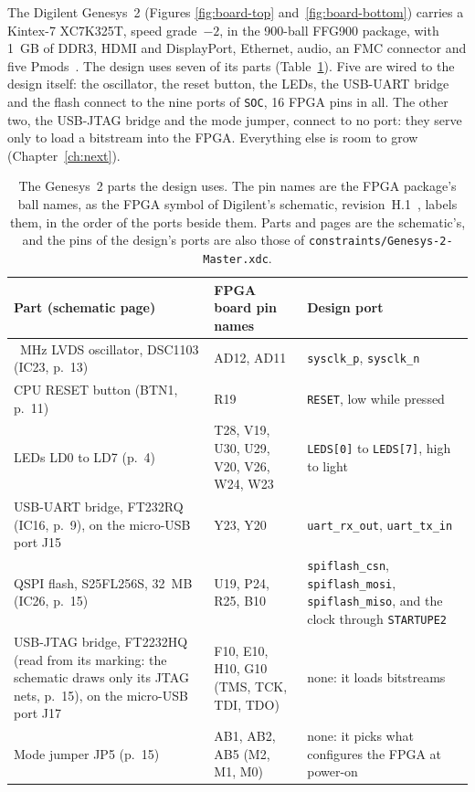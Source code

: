 \documentclass[11pt,a4paper]{report}
\begin{document}
The Digilent Genesys~2 (Figures \ref{fig:board-top} and~\ref{fig:board-bottom}) carries a
Kintex-7 XC7K325T, speed grade~$-2$, in the 900-ball FFG900 package, with 1~GB of DDR3,
HDMI and DisplayPort, Ethernet, audio, an FMC connector and five
Pmods~\cite{digilent-genesys2-rm}. The design uses seven of its parts
(Table~\ref{tab:board-parts}). Five are wired to the design itself: the oscillator, the reset
button, the LEDs, the USB-UART bridge and the flash connect to the nine ports of \texttt{SOC},
16 FPGA pins in all. The other two, the USB-JTAG bridge and the mode jumper, connect to no
port: they serve only to load a bitstream into the FPGA. Everything else is room to grow
(Chapter~\ref{ch:next}).

\begin{table}[!ht]
  \centering
  \small
  \begin{tabular}{@{}>{\raggedright\arraybackslash}p{4.6cm}
      >{\raggedright\arraybackslash}p{3.7cm}>{\raggedright\arraybackslash}p{5.3cm}@{}}
    \toprule
    Part (schematic page) & FPGA board pin names & Design port \\
    \midrule
    200~MHz LVDS oscillator, DSC1103 (IC23, p.~13) & AD12, AD11
      & \texttt{sysclk\_p}, \texttt{sysclk\_n} \\
    \midrule
    CPU RESET button (BTN1, p.~11) & R19 & \texttt{RESET}, low while pressed \\
    \midrule
    LEDs LD0 to LD7 (p.~4) & T28, V19, U30, U29, V20, V26, W24, W23 & \texttt{LEDS[0]} to
      \texttt{LEDS[7]}, high to light \\
    \midrule
    USB-UART bridge, FT232RQ (IC16, p.~9), on the micro-USB port J15 & Y23, Y20
      & \texttt{uart\_rx\_out}, \texttt{uart\_tx\_in} \\
    \midrule
    QSPI flash, S25FL256S, 32~MB (IC26, p.~15) & U19, P24, R25, B10
      & \texttt{spiflash\_csn}, \texttt{spiflash\_mosi}, \texttt{spiflash\_miso}, and the
      clock through \texttt{STARTUPE2} \\
    \midrule
    USB-JTAG bridge, FT2232HQ (read from its marking: the schematic draws only its JTAG
      nets, p.~15), on the micro-USB port J17 & F10, E10, H10, G10 (TMS, TCK, TDI, TDO)
      & none: it loads bitstreams \\
    \midrule
    Mode jumper JP5 (p.~15) & AB1, AB2, AB5 (M2, M1, M0) & none: it picks what configures
      the FPGA at power-on \\
    \bottomrule
  \end{tabular}
  \caption{The Genesys~2 parts the design uses. The pin names are the FPGA package's ball
    names, as the FPGA symbol of Digilent's schematic, revision~H.1~\cite{digilent-genesys2-sch},
    labels them, in the order of the ports beside them. Parts and pages are the schematic's,
    and the pins of the design's ports are also those of
    \texttt{constraints/Genesys-2-Master.xdc}.}
  \label{tab:board-parts}
\end{table}
\end{document}
